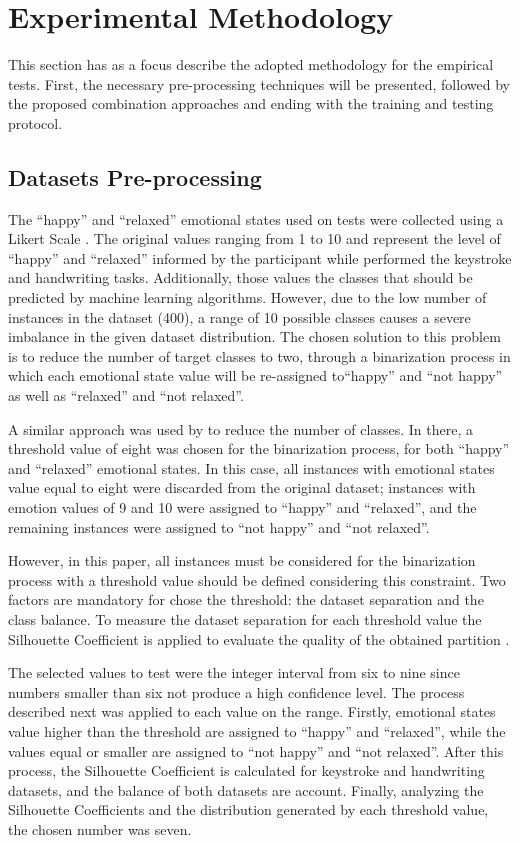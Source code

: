 \documentclass[conference]{IEEEtran}
\begin{document}
\section{Experimental Methodology}

This section has as a focus describe the adopted methodology for the empirical tests. First, the necessary pre-processing techniques will be 
presented, followed by the proposed combination approaches and ending with the training and testing protocol. 

\subsection{Datasets Pre-processing}

The ``happy'' and ``relaxed'' emotional states used on tests were collected using a Likert Scale \cite{likert}. The original values ranging from 1 to 10 and represent the level of ``happy'' and ``relaxed''  informed by the participant while performed the keystroke and handwriting tasks. Additionally,  those values the classes that should be predicted by machine learning algorithms.
However, due to the low number of instances in the dataset (400), a range of 10 possible classes causes a severe imbalance in the given dataset distribution. The chosen solution to this problem is to reduce the number of target classes to two, through a binarization process in which each emotional state value will be re-assigned to``happy'' and ``not happy'' as well as ``relaxed'' and ``not relaxed''. 

A similar approach was used by \cite{cheng-thesis} to reduce the number of classes. In there, a threshold value of eight was chosen for the binarization process, for both ``happy'' and ``relaxed'' emotional states. In this case, all instances with emotional states value equal to eight were discarded from the original dataset; instances with emotion values of 9 and 10 were assigned to ``happy'' and ``relaxed'', and the remaining instances were assigned to ``not happy'' and ``not relaxed''.

However, in this paper, all instances must be considered for the binarization process with a  threshold value should be defined considering this constraint. Two factors are mandatory for chose the threshold: the dataset separation and the class balance. To measure the dataset separation for each threshold value the Silhouette Coefficient is applied to evaluate the quality of the obtained partition \cite{silhouettes}. 

The selected values to test were the integer interval from six to nine since numbers smaller than six not produce a high confidence level. The process described next was applied to each value on the range. Firstly, emotional states value higher than the threshold are assigned to ``happy'' and ``relaxed'',  while the values equal or smaller are assigned to ``not happy'' and ``not relaxed''. After this process, the Silhouette Coefficient is calculated for keystroke and handwriting datasets, and the balance of both datasets are account. Finally, analyzing the Silhouette Coefficients and the distribution generated by each threshold value, the chosen number was seven.
\end{document}
